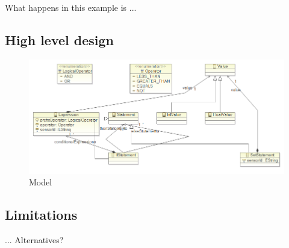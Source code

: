 What happens in this example is ...

\subsection{High level design}

\begin{figure}[t]
\includegraphics[width=1.00\columnwidth]{model.png}
\caption{Model}
\end{figure}


\subsection{Limitations}
... Alternatives?